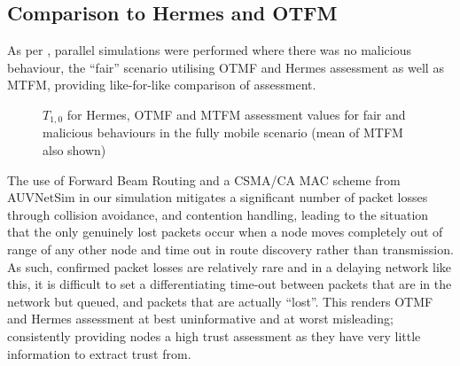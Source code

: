 \documentclass[conference]{IEEEtran}
\begin{document}
\subsection{Comparison to Hermes and OTFM}
As per \cite{Guo11}, parallel simulations were performed where there was no malicious behaviour, the ``fair'' scenario utilising OTMF and Hermes assessment as well as MTFM, providing like-for-like comparison of assessment.
%
\begin{figure}[h]
  \newline
  \centering
\caption{$T_{1,0}$ for Hermes, OTMF and MTFM assessment values for fair and malicious behaviours in the fully mobile scenario (mean of MTFM also shown)}
\label{fig:otmf_beta_comparison}
\end{figure}
%
The use of Forward Beam Routing and a CSMA/CA MAC scheme from AUVNetSim\cite{Miquel2008} in our simulation mitigates a significant number of packet losses through collision avoidance, and contention handling, leading to the situation that the only genuinely lost packets occur when a node moves completely out of range of any other node and time out in route discovery rather than transmission.
As such, confirmed packet losses are relatively rare and in a delaying network like this, it is difficult to set a differentiating time-out between packets that are in the network but queued, and packets that are actually ``lost''.
This renders OTMF and Hermes assessment at best uninformative and at worst misleading; consistently providing nodes a high trust assessment as they have very little information to extract trust from. 
\end{document}
